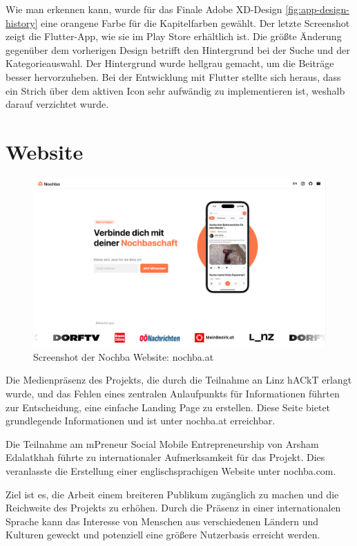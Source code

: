 Wie man erkennen kann, wurde für das Finale Adobe
XD-Design \ref{fig:app-design-history} eine orangene Farbe für die Kapitelfarben
gewählt. Der letzte Screenshot zeigt die Flutter-App, wie
sie im Play Store erhältlich ist. Die größte Änderung
gegenüber dem vorherigen Design betrifft den Hintergrund
bei der Suche und der Kategorieauswahl. Der Hintergrund
wurde hellgrau gemacht, um die Beiträge besser hervorzuheben.
Bei der Entwicklung mit Flutter stellte sich heraus, dass
ein Strich über dem aktiven Icon sehr aufwändig zu
implementieren ist, weshalb darauf verzichtet wurde.




\section{Website}
\begin{figure}[h]
  \includegraphics[width=1\textwidth]{pics/website-design.png}
  \caption{Screenshot der Nochba Website: nochba.at}
\end{figure}

Die Medienpräsenz des Projekts, die durch die Teilnahme an
Linz hACkT erlangt wurde, und das Fehlen eines zentralen
Anlaufpunkts für Informationen führten zur Entscheidung,
eine einfache Landing Page zu erstellen.
Diese Seite bietet grundlegende Informationen und ist unter nochba.at\cite{nochba_at} erreichbar.

Die Teilnahme am mPreneur Social Mobile Entrepreneurship von Arsham Edalatkhah führte zu internationaler Aufmerksamkeit für das Projekt. Dies veranlasste die Erstellung einer englischsprachigen Website unter nochba.com\cite{nochba_com}.



Ziel ist es, die Arbeit einem breiteren Publikum zugänglich zu machen und die Reichweite des Projekts zu erhöhen. Durch die Präsenz in einer internationalen Sprache kann das Interesse von Menschen aus verschiedenen Ländern und Kulturen geweckt und potenziell eine größere Nutzerbasis erreicht werden.



